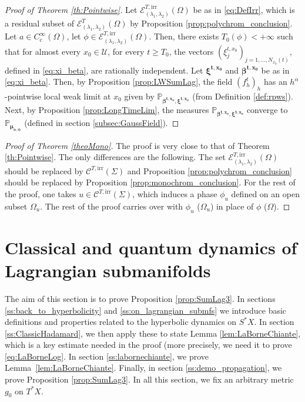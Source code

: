 \documentclass[JEP,XML,SOM,Unicode,published]{cedram}
\let\mathcal\mathscr
\newcommand{\rc}{\mathrm{c}}
\newcommand{\irr}{\mathrm{irr}}
\theoremstyle{plain}
\theoremstyle{definition}
\def\calC{\mathcal{C}}
\def\calE{\mathcal{E}}
\def\calU{\mathcal{U}}
\begin{document}
\begin{proof}[Proof of Theorem \ref{th:Pointwise}]
Let $\calE^{T,\irr}_{(\lambda_1,\lambda_2)}(\Omega)$ be as in \eqref{eq:DefIrr}, which is a residual subset of $\calE^T_{(\lambda_1,\lambda_2)}(\Omega)$ by Proposition \ref{prop:polychrom_conclusion}. Let $a\in C_\rc^\infty(\Omega)$, let $\phi\in\calE^{T,\irr}_{(\lambda_1,\lambda_2)}(\Omega)$. Then, there exists $T_0(\phi)<+\infty$ such that for almost every $x_0\in\calU$, for every $t\geq T_0$, the vectors $(\xi_j^{t,x_0})_{j=1,\dots,N_{x_0}(t)}$, defined in \eqref{eq:xi_beta}, are rationally independent. Let $\boldsymbol{\xi^{t,x_0}}$ and $\boldsymbol{\beta^{t,x_0}}$ be as in \eqref{eq:xi_beta}. Then, by Proposition \ref{prop:LWSumLag}, the field $(f_h^t)_h$ has an $h^\alpha$-pointwise local weak limit at $x_0$ given by $\mathbb{P}_{\boldsymbol{\beta^{t,x_0}},\boldsymbol{\xi^{t,x_0}}}$ (from Definition \ref{def:rpws}). Next, by Proposition \ref{prop:LongTimeLim}, the measures $\mathbb{P}_{\boldsymbol{\beta^{t,x_0}},\boldsymbol{\xi^{t,x_0}}}$ converge to $\mathbb{P}_{\boldsymbol{\mu_{a,\phi}}}$ (defined in section \ref{subsec:GaussField}).
\end{proof}
\begin{proof}[Proof of Theorem \ref{theoMono}]
The proof is very close to that of Theorem \ref{th:Pointwise}. The only differences are the following. The set $\calE^{T,\irr}_{(\lambda_1,\lambda_2)}(\Omega)$ should be replaced by $\calC^{T,\irr}(\Sigma)$ and Proposition \ref{prop:polychrom_conclusion} should be replaced by Proposition \ref{prop:monochrom_conclusion}. For the rest of the proof, one takes $u\in\calC^{T,\irr}(\Sigma)$, which induces a phase $\phi_u$ defined on an open subset $\Omega_u$. The rest of the proof carries over with $\phi_u$ (\resp $\Omega_u$) in place of $\phi$ (\resp $\Omega$).
\end{proof}

\section{Classical and quantum dynamics of Lagrangian submanifolds}\label{sec:ClasDyn}

The aim of this section is to prove Proposition \ref{prop:SumLag3}. In sections \ref{ss:back_to_hyperbolicity} and \ref{ss:on_lagrangian_submfs} we introduce basic definitions and properties related to the hyperbolic dynamics on $S^*X$. In section \ref{ss:ClassicHadamard}, we then apply these to state Lemma \ref{lem:LaBorneChiante}, which is a key estimate needed in the proof (more precisely, we need it to prove \eqref{eq:LaBorneLog}. In section \ref{ss:labornechiante}, we prove Lem\-ma~\ref{lem:LaBorneChiante}. Finally, in section \ref{ss:demo_propagation}, we prove Proposition \ref{prop:SumLag3}. In all this section, we fix an arbitrary metric $g_0$ on $T^*X$.
\end{document}
